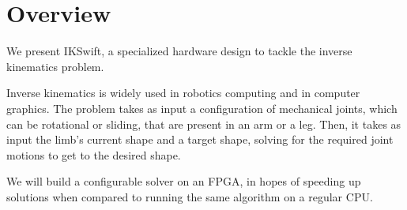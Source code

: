 \section{Overview}

We present IKSwift, a specialized hardware design to tackle the inverse kinematics problem.

Inverse kinematics is widely used in robotics computing and in computer graphics. The problem takes as input a configuration of mechanical joints, which can be rotational or sliding, that are present in an arm or a leg. Then, it takes as input the limb's current shape and a target shape, solving for the required joint motions to get to the desired shape.

We will build a configurable solver on an FPGA, in hopes of speeding up solutions when compared to running the same algorithm on a regular CPU.